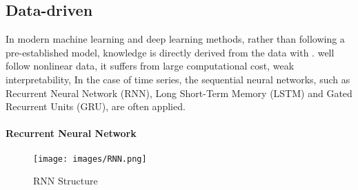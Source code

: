 \subsection{Data-driven }
\vspace{-0.10in}
In modern machine learning and deep learning methods, rather than following a pre-established model, knowledge is directly derived from the data with .  
 well follow nonlinear data, it suffers from large computational cost, weak interpretability,   In the case of time series, the sequential neural networks, such as Recurrent Neural Network (RNN)\cite{madan2018predicting}, Long Short-Term Memory (LSTM)\cite{reddy2018prediction} and Gated Recurrent Units (GRU)\cite{fu2016using}, are often applied. 
\paragraph{Recurrent Neural Network}
\vspace{-0.10in}

\begin{figure}
  \begin{center}
\texttt{[image: images/RNN.png]}
  \end{center}
  \vspace{-10pt}
  \caption{\footnotesize RNN Structure}
\label{RNN}
  \vspace{-10pt}
\end{figure}


